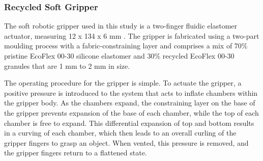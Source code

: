 \documentclass[lettersize,journal]{IEEEtran}
\begin{document}
\subsubsection{Recycled Soft Gripper}
The soft robotic gripper used in this study is a two-finger fluidic elastomer actuator, measuring 12 x 134 x 6 mm \cite{Partridge2022}. The gripper is fabricated using a two-part moulding process with a fabric-constraining layer and comprises a mix of 70\% pristine EcoFlex 00-30 silicone elastomer and 30\% recycled EcoFlex 00-30 granules that are 1 mm to 2 mm in size.%

The operating procedure for the gripper is simple. To actuate the gripper, a positive pressure is introduced to the system that acts to inflate chambers within the gripper body. As the chambers expand, the constraining layer on the base of the gripper prevents expansion of the base of each chamber, while the top of each chamber is free to expand. This differential expansion of top and bottom results in a curving of each chamber, which then leads to an overall curling of the gripper fingers to grasp an object. When vented, this pressure is removed, and the gripper fingers return to a flattened state. 

%
\end{document}
